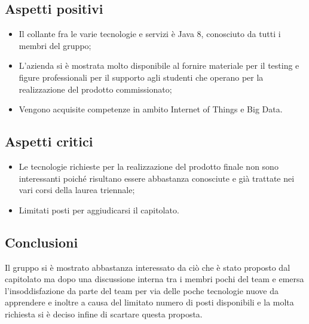 \subsection{Aspetti positivi}
\begin{itemize}
\item Il collante fra le varie tecnologie e servizi \`e Java 8, conosciuto da tutti i membri del gruppo;
\item L'azienda si \`e mostrata molto disponibile al fornire materiale per il testing e figure professionali per il supporto agli studenti che operano per la realizzazione del prodotto commissionato;
\item Vengono acquisite competenze in ambito Internet of Things e Big Data.
\end{itemize}

\subsection{Aspetti critici}

\begin{itemize}
\item Le tecnologie richieste per la realizzazione del prodotto finale non sono interessanti poiché risultano essere abbastanza conosciute e già trattate nei vari corsi della laurea triennale;
\item Limitati posti per aggiudicarsi il capitolato.

\end{itemize}
\subsection{Conclusioni}
Il gruppo si \`e mostrato abbastanza interessato da ci\`o che \`e stato proposto dal capitolato ma dopo una discussione interna tra i membri pochi del team e emersa l'insoddisfazione da parte del team per via delle poche tecnologie nuove da apprendere e inoltre a causa del limitato numero di posti disponibili e la molta richiesta si \`e deciso infine di scartare questa proposta.